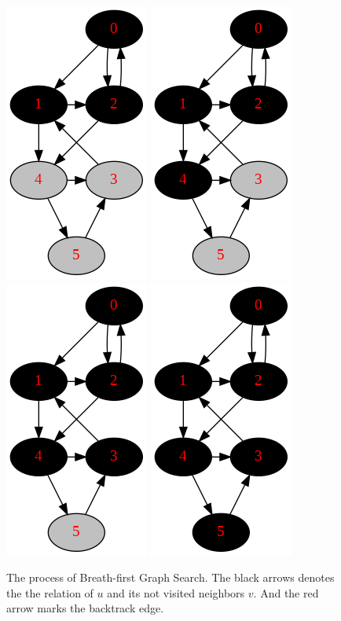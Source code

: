 \documentclass[../main.tex]{subfiles}
\begin{document}
\begin{figure}[!ht]
        \includegraphics[width=0.2\columnwidth]{fig/breath_first_graph_search_process8.png}
    \includegraphics[width=0.2\columnwidth]{fig/breath_first_graph_search_process9.png}
    \includegraphics[width=0.2\columnwidth]{fig/breath_first_graph_search_process10.png}
    \includegraphics[width=0.2\columnwidth]{fig/breath_first_graph_search_process11.png}
    \caption{The process of Breath-first Graph Search. The black arrows denotes the the relation of $u$ and its not visited neighbors $v$. And the red arrow marks the backtrack edge. }
    \label{fig:breath_first_graph_search_process}
\end{figure}
\end{document}
